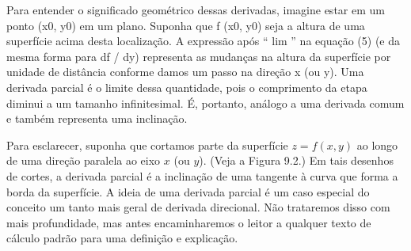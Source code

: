 Para entender o significado geométrico dessas derivadas, imagine estar em um ponto (x0, y0) em um plano. Suponha que f (x0, y0) seja a altura de uma superfície acima desta localização. A expressão após `` lim '' na equação (5) (e da mesma forma para df / dy) representa as mudanças na altura da superfície por unidade de distância conforme damos um passo na direção x (ou y). Uma derivada parcial é o limite dessa quantidade, pois o comprimento da etapa diminui a um tamanho infinitesimal. É, portanto, análogo a uma derivada comum e também representa uma inclinação.

Para esclarecer, suponha que cortamos parte da superfície $z = f(x, y)$ ao longo de uma direção paralela ao eixo $x$ (ou $y$). (Veja a Figura 9.2.) Em tais desenhos de cortes, a derivada parcial é a inclinação de uma tangente à curva que forma a borda da superfície. A ideia de uma derivada parcial é um caso especial do conceito um tanto mais geral de derivada direcional. Não trataremos disso com mais profundidade, mas antes encaminharemos o leitor a qualquer texto de cálculo padrão para uma definição e explicação.

